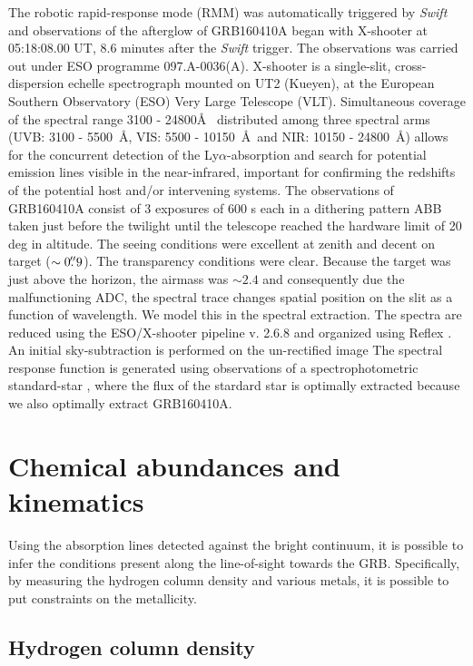 \documentclass[a4paper,fleqn,usenatbib]{mnras}
\newcommand{\lya}{Ly$\alpha$}
\begin{document}
 The robotic rapid-response mode (RMM) was automatically triggered by
 \textit{Swift} and observations of the afterglow of GRB160410A began with
 X-shooter \citep{Vernet2011} at 05:18:08.00 UT, 8.6 minutes after the
 \textit{Swift} trigger. The observations was carried out under ESO programme
 097.A-0036(A). X-shooter is a single-slit, cross-dispersion echelle
 spectrograph mounted on UT2 (Kueyen), at the European Southern Observatory
 (ESO) Very Large Telescope (VLT). Simultaneous coverage of the spectral range
 3100 - 24800\AA~ distributed among three spectral arms (UVB: 3100 - 5500~\AA,
 VIS: 5500 - 10150~\AA~and NIR: 10150 - 24800~\AA) allows for the concurrent
 detection of the \lya-absorption and search for potential emission lines
 visible in the near-infrared, important for confirming the redshifts of the
 potential host and/or intervening systems. The observations of GRB160410A
 consist of 3 exposures of 600 s each in a dithering pattern ABB taken just
 before the twilight until the telescope reached the hardware limit of 20 deg in
 altitude. The seeing conditions were excellent at zenith and decent on target
 ($\sim0\hbox{$.\!\!^{\prime\prime}$}9$). The transparency conditions were clear. Because the target
 was just above the horizon, the airmass was $\sim2.4$ and consequently due the
 malfunctioning ADC, the spectral trace changes spatial position on the slit as
 a function of wavelength. We model this in the spectral extraction. The spectra
 are reduced using the ESO/X-shooter pipeline v. 2.6.8 \citep{Modigliani2010}
 and organized using Reflex \citep{Freudling2013}. An initial sky-subtraction is
 performed on the un-rectified image The spectral response function is generated
 using observations of a spectrophotometric standard-star \citep{Vernet2010,
 	Hamuy1994}, where the flux of the stardard star is optimally extracted because
 we also optimally extract GRB160410A.

\section{Chemical abundances and kinematics}

Using the absorption lines detected against the bright continuum, it is possible
to infer the conditions present along the line-of-sight towards the GRB.
Specifically, by measuring the hydrogen column density and various metals, it is
possible to put constraints on the metallicity.

\subsection{Hydrogen column density}
\end{document}

